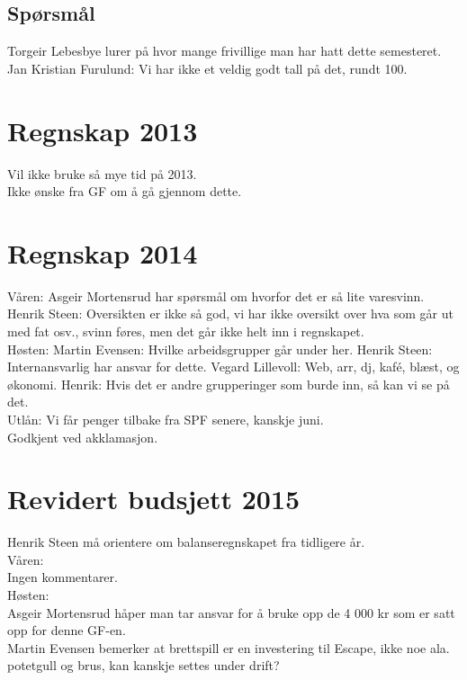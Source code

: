 \documentclass[10pt,norsk,a4paper]{article}
\begin{document}
\subsection{Spørsmål}
Torgeir Lebesbye lurer på hvor mange frivillige man har hatt dette semesteret. Jan Kristian Furulund: Vi har ikke et veldig godt tall på det, rundt 100.

\newpage


\section{Regnskap 2013}
Vil ikke bruke så mye tid på 2013.\\
Ikke ønske fra GF om å gå gjennom dette.


\section{Regnskap 2014}
Våren:
Asgeir Mortensrud har spørsmål om hvorfor det er så lite varesvinn. Henrik Steen: Oversikten er ikke så god, vi har ikke oversikt over hva som går ut med fat osv., svinn føres, men det går ikke helt inn i regnskapet.\\

Høsten:
Martin Evensen: Hvilke arbeidsgrupper går under her. Henrik Steen: Internansvarlig har ansvar for dette. Vegard Lillevoll: Web, arr, dj, kafé, blæst, og økonomi. Henrik: Hvis det er andre grupperinger som burde inn, så kan vi se på det.\\
Utlån: Vi får penger tilbake fra SPF senere, kanskje juni.\\

Godkjent ved akklamasjon.



\section{Revidert budsjett 2015}
Henrik Steen må orientere om balanseregnskapet fra tidligere år.\\

Våren:\\
Ingen kommentarer.\\

Høsten:\\
Asgeir Mortensrud håper man tar ansvar for å bruke opp de 4 000 kr som er satt opp for denne GF-en.\\

Martin Evensen bemerker at brettspill er en investering til Escape, ikke noe ala. potetgull og brus, kan kanskje settes under drift?\\
\end{document}
